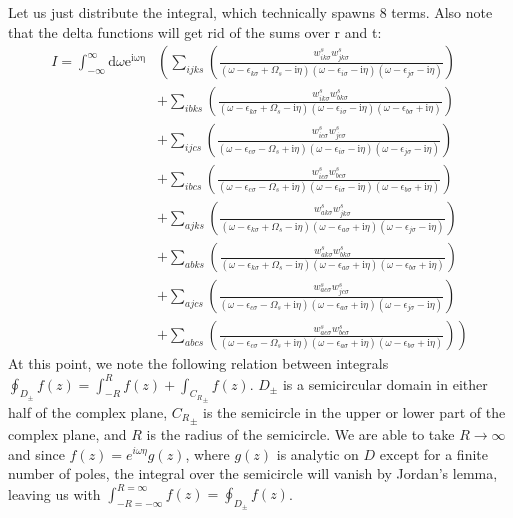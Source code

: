 \documentclass[12pt]{caltech_thesis}
\begin{document}
Let us just distribute the integral, which technically spawns 8 terms. Also note that the delta functions will get rid of the sums over r and t:
\begin{equation}
\begin{aligned}
I = \int_{-\infty }^{\infty }\mathrm{d} \omega \mathrm{e}^{\mathrm{i \omega \eta}} 
& \left( \sum_{ijks} \left( \frac{w_{i k \sigma}^s w_{j k \sigma}^s}{(\omega-\epsilon_{k \sigma}+\Omega_s-\mathrm{i} \eta)(\omega-\epsilon_{i \sigma}-\mathrm{i} \eta)(\omega-\epsilon_{j \sigma}-\mathrm{i} \eta)} \right) \right.\\
& \left. + \sum_{ibks} \left( \frac{w_{i k \sigma}^s w_{b k \sigma}^s}{(\omega-\epsilon_{k \sigma}+\Omega_s-\mathrm{i} \eta)(\omega-\epsilon_{i \sigma}-\mathrm{i} \eta)(\omega-\epsilon_{b \sigma}+\mathrm{i} \eta)} \right) \right.\\
& \left. + \sum_{ijcs} \left( \frac{w_{i c \sigma}^s w_{j c \sigma}^s}{(\omega-\epsilon_{c \sigma}-\Omega_s+\mathrm{i} \eta)(\omega-\epsilon_{i \sigma}-\mathrm{i} \eta)(\omega-\epsilon_{j \sigma}-\mathrm{i} \eta)} \right) \right.\\
& \left. + \sum_{ibcs} \left( \frac{w_{i c \sigma}^s w_{b c \sigma}^s}{(\omega-\epsilon_{c \sigma}-\Omega_s+\mathrm{i} \eta)(\omega-\epsilon_{i \sigma}-\mathrm{i} \eta)(\omega-\epsilon_{b \sigma}+\mathrm{i} \eta)} \right) \right. \\
& \left. + \sum_{ajks} \left( \frac{w_{a k \sigma}^s w_{j k \sigma}^s}{(\omega-\epsilon_{k \sigma}+\Omega_s-\mathrm{i} \eta)(\omega-\epsilon_{a \sigma}+\mathrm{i} \eta)(\omega-\epsilon_{j \sigma}-\mathrm{i} \eta)} \right) \right.\\
& \left. + \sum_{abks} \left( \frac{w_{a k \sigma}^s w_{b k \sigma}^s}{(\omega-\epsilon_{k \sigma}+\Omega_s-\mathrm{i} \eta)(\omega-\epsilon_{a \sigma}+\mathrm{i} \eta)(\omega-\epsilon_{b \sigma}+\mathrm{i} \eta)} \right) \right.\\
& \left. + \sum_{ajcs} \left( \frac{w_{a c \sigma}^s w_{j c \sigma}^s}{(\omega-\epsilon_{c \sigma}-\Omega_s+\mathrm{i} \eta)(\omega-\epsilon_{a \sigma}+\mathrm{i} \eta)(\omega-\epsilon_{j \sigma}-\mathrm{i} \eta)} \right) \right.\\
& \left. + \sum_{abcs} \left( \frac{w_{a c \sigma}^s w_{b c \sigma}^s}{(\omega-\epsilon_{c \sigma}-\Omega_s+\mathrm{i} \eta)(\omega-\epsilon_{a \sigma}+\mathrm{i} \eta)(\omega-\epsilon_{b \sigma}+\mathrm{i} \eta)} \right) \right)
\label{eqn:expanded_integral}
\end{aligned}
\end{equation}
At this point, we note the following relation between integrals $\oint_{D_{\pm}} f(z) = \int_{-R}^R f(z) + \int_{{C_R}_{\pm}} f(z)$. $D_{\pm}$ is a semicircular domain in either half of the complex plane, ${C_R}_{\pm}$ is the semicircle in the upper or lower part of the complex plane, and $R$ is the radius of the semicircle. We are able to take $R\rightarrow \infty$ and since $f(z)=e^{i\omega \eta}g(z)$, where $g(z)$ is analytic on $D$ except for a finite number of poles, the integral over the semicircle will vanish by Jordan's lemma, leaving us with $\int_{-R=-\infty}^{R=\infty} f(z)= \oint_{D_{\pm}} f(z)$. 
\end{document}
